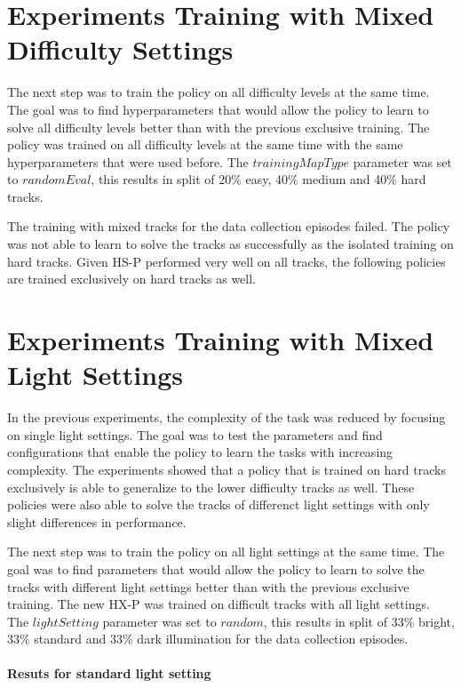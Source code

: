 \section{Experiments Training with Mixed Difficulty Settings}
\label{cha:experiment_mixed_difficulty}

The next step was to train the policy on all difficulty levels at the same time. The goal was to find hyperparameters that would allow the policy to learn to solve all difficulty levels better than with the previous exclusive training. The policy was trained on all difficulty levels at the same time with the same hyperparameters that were used before. The $trainingMapType$ parameter was set to $randomEval$, this results in split of 20\% easy, 40\% medium and 40\% hard tracks.

The training with mixed tracks for the data collection episodes failed. The policy was not able to learn to solve the tracks as successfully as the isolated training on hard tracks. Given \ac{HS-P} performed very well on all tracks, the following policies are trained exclusively on hard tracks as well.


\section{Experiments Training with Mixed Light Settings}
\label{cha:experiment_mixed_light}

In the previous experiments, the complexity of the task was reduced by focusing on single light settings. The goal was to test the parameters and find configurations that enable the policy to learn the tasks with increasing complexity. The experiments showed that a policy that is trained on hard tracks exclusively is able to generalize to the lower difficulty tracks as well. These policies were also able to solve the tracks of differenct light settings with only slight differences in performance.


The next step was to train the policy on all light settings at the same time. The goal was to find parameters that would allow the policy to learn to solve the tracks with different light settings better than with the previous exclusive training. The new \ac{HX-P} was trained on difficult tracks with all light settings. The $lightSetting$ parameter was set to $random$, this results in split of 33\% bright, 33\% standard and 33\% dark illumination for the data collection episodes.

\paragraph{Resuts for standard light setting}

